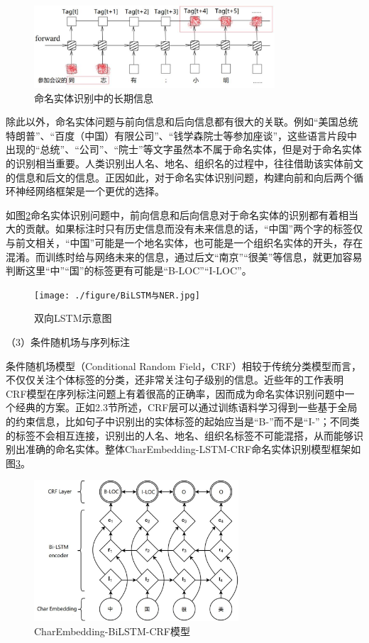 \documentclass[winfonts,master,oneside,nobackinfo]{njuthesis}
\begin{document}
\begin{figure}[h]
\centering
\includegraphics[width=0.8\textwidth]{./figure/命名实体识别长期信息.jpg}
\caption{命名实体识别中的长期信息}
\label{simple_rnn}
\end{figure}

除此以外，命名实体问题与前向信息和后向信息都有很大的关联。例如“美国总统特朗普”、“百度（中国）有限公司”、“钱学森院士等参加座谈”，这些语言片段中出现的“总统”、“公司”、“院士”等文字虽然本不属于命名实体，但是对于命名实体的识别相当重要。人类识别出人名、地名、组织名的过程中，往往借助该实体前文的信息和后文的信息。正因如此，对于命名实体识别问题，构建向前和向后两个循环神经网络框架是一个更优的选择。

如图\ref{bilstm}命名实体识别问题中，前向信息和后向信息对于命名实体的识别都有着相当大的贡献。如果标注时只有历史信息而没有未来信息的话，“中国”两个字的标签仅与前文相关，“中国”可能是一个地名实体，也可能是一个组织名实体的开头，存在混淆。而训练时给与网络未来的信息，通过后文“南京”“很美”等信息，就更加容易判断这里“中”“国”的标签更有可能是“B-LOC”“I-LOC”。

\begin{figure}[h]
\centering
\texttt{[image: ./figure/BiLSTM与NER.jpg]}
\caption{双向LSTM示意图}
\label{bilstm}
\end{figure}

（3）条件随机场与序列标注

条件随机场模型（Conditional Random Field，CRF）相较于传统分类模型而言，不仅仅关注个体标签的分类，还非常关注句子级别的信息。近些年的工作表明CRF模型在序列标注问题上有着很高的正确率，因而成为命名实体识别问题中一个经典的方案。正如2.3节所述，CRF层可以通过训练语料学习得到一些基于全局的约束信息，比如句子中识别出的实体标签的起始应当是“B-”而不是“I-”；不同类的标签不会相互连接，识别出的人名、地名、组织名标签不可能混搭，从而能够识别出准确的命名实体。整体CharEmbedding-LSTM-CRF命名实体识别模型框架如图\ref{CE-BiLSTM-CRF}。

\begin{figure}[h]
\centering
\includegraphics[width=0.68\textwidth]{./figure/CE-LSTM-CRF.jpg}
\caption{CharEmbedding-BiLSTM-CRF模型}
\label{CE-BiLSTM-CRF}
\end{figure}
\end{document}
